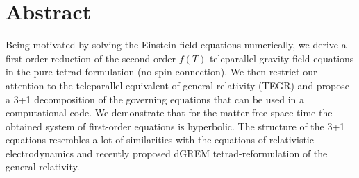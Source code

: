 \documentclass[
10pt, %
a4paper, %
oneside, %
headinclude,footinclude, %
BCOR5mm, %
]{scrartcl}
\begin{document}
\section*{Abstract} %
Being motivated by solving the Einstein field equations numerically, we derive a first-order 
reduction of the second-order $ f(T) $-teleparallel gravity field 
equations 
in the pure-tetrad formulation (no spin connection). We then restrict our attention to the 
teleparallel equivalent of general relativity (TEGR) and propose a 3+1 decomposition of the governing 
equations that can be used in a computational code. We demonstrate that for the matter-free 
space-time the obtained system of first-order equations is hyperbolic. The structure of the 
3+1  equations 
resembles 
a lot of similarities with the equations of relativistic electrodynamics and recently proposed 
dGREM tetrad-reformulation of the general relativity. 
\renewcommand{\thefootnote}{\arabic{footnote}}

\end{document}
